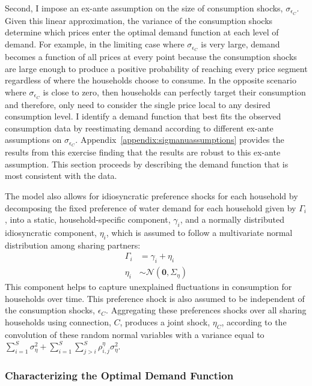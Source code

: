 \documentclass[12pt]{article}
\begin{document}
Second, I impose an ex-ante assumption on the size of consumption shocks, $\sigma_{\epsilon_C}$.  Given this linear approximation, the variance of the consumption shocks determine which prices enter the optimal demand function at each level of demand.  For example, in the limiting case where $\sigma_{\epsilon_C}$ is very large, demand becomes a function of all prices at every point because the consumption shocks are large enough to produce a positive probability of reaching every price segment regardless of where the households choose to consume.  In the opposite scenario where $\sigma_{\epsilon_C}$ is close to zero, then households can perfectly target their consumption and therefore, only need to consider the single price local to any desired consumption level.  I identify a demand function that best fits the observed consumption data by reestimating demand according to different ex-ante assumptions on $\sigma_{\epsilon_C}$.   Appendix~\ref{appendix:sigmanuassumptions} provides the results from this exercise finding that the results are robust to this ex-ante assumption.  This section proceeds by describing the demand function that is most consistent with the data.  

The model also allows for idiosyncratic preference shocks for each household by decomposing the fixed preference of water demand for each household given by $\Gamma_{i}$, into a static, household-specific component, $\gamma_i$, and a normally distributed idiosyncratic component, $\eta_{i}$, which is assumed to follow a multivariate normal distribution among sharing partners:
\begin{align*}
\Gamma_{i} &= \gamma_i + \eta_{i} \\
\eta_{i} &\sim \mathcal{N} (\textbf{0},\Sigma_{\eta}) 
\end{align*}
This component helps to capture unexplained fluctuations in consumption for households over time.  This preference shock is also assumed to be independent of the consumption shocks, $\epsilon_C$.  Aggregating these preferences shocks over all sharing households using connection, $C$, produces a joint shock, $\eta_C$, according to the convolution of these random normal variables with a variance equal to $\sum_{i=1}^{S} \sigma_{\eta}^2 + \sum_{i=1}^{S} \sum_{j>i}^{S} \rho^{\eta}_{i,j} \sigma_{\eta}^2$.

\subsubsection{Characterizing the Optimal Demand Function}
\end{document}
